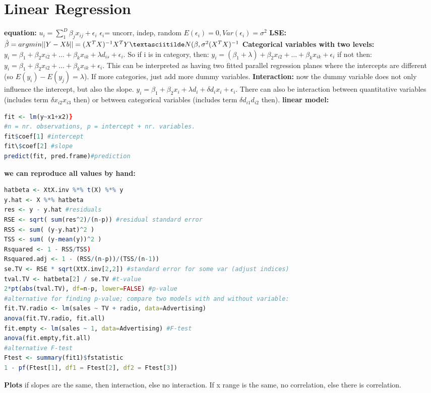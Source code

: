 \section{Linear Regression}
\textbf{equation: }$u_i = \sum_1^D \beta_j x_{ij} + \epsilon_i$
$\epsilon_i $= uncorr, indep, random $E(\epsilon_i) = 0, Var(\epsilon_i) = \sigma^2$
\textbf{LSE:} $\hat\beta = argmin ||Y-Xb|| = (X^TX)^{-1}X^TY \textasciitilde N(\beta,\sigma^2(X^TX)^{-1}$
\textbf{Categorical variables with two levels: } $y_i = \beta_1 + \beta_2 x_{i2}+...+\beta_k x_{ik}+\lambda d_{is}+\epsilon_i$. So if i is in category, then: $y_i = (\beta_1+\lambda) + \beta_2x_{i2}+...+\beta_k x_{ik}+\epsilon_i$ if not then: $y_i = \beta_1 + \beta_2x_{i2}+...+\beta_k x_{ik}+\epsilon_i$. This can be interpreted as having two fitted parallel regression planes where the intercepts are different (so $E(y_i)-E(y_j) = \lambda$). If more categories, just add more dummy variables.
\textbf{Interaction: } now the dummy variable does not only influence the intercept, but also the slope. $y_i = \beta_1 + \beta_2x_i + \lambda d_i + \delta d_i x_i + \epsilon_i$. There can also be interaction between quantitative variables (includes term $\delta x_{i2}x_{i3}$ then) or between categorical variables (includes term $\delta d_{i1}d_{i2}$ then).
\textbf{linear model:} \begin{lstlisting}[language=R]
fit <- lm(y~x1+x2)}
#n = nr. observations, p = intercept + nr. variables. 
fit$coef[1] #intercept
fit\$coef[2] #slope 
predict(fit, pred.frame)#prediction
\end{lstlisting}
\textbf{we can reproduce all values by hand: }
\begin{lstlisting}[language=R]
hatbeta <- XtX.inv %*% t(X) %*% y
y.hat <- X %*% hatbeta
res <- y - y.hat #residuals
RSE <- sqrt( sum(res^2)/(n-p)) #residual standard error
RSS <- sum( (y-y.hat)^2 ) 
TSS <- sum( (y-mean(y))^2 )
Rsquared <- 1 - RSS/TSS) 
Rsquared.adj <- 1 - (RSS/(n-p))/(TSS/(n-1))
se.TV <- RSE * sqrt(XtX.inv[2,2]) #standard error for some var (adjust indices)
tval.TV <- hatbeta[2] / se.TV #t-value
2*pt(abs(tval.TV), df=n-p, lower=FALSE) #p-value
#alternative for finding p-value; compare two models with and without variable: 
fit.TV.radio <- lm(sales ~ TV + radio, data=Advertising)
anova(fit.TV.radio, fit.all)
fit.empty <- lm(sales ~ 1, data=Advertising) #F-test
anova(fit.empty,fit.all)
#alternative F-test
Ftest <- summary(fit1)$fstatistic 
1 - pf(Ftest[1], df1 = Ftest[2], df2 = Ftest[3])
\end{lstlisting}
\textbf{Plots} if slopes are the same, then interaction, else no interaction. If x range is the same, no correlation, else there is correlation. 
